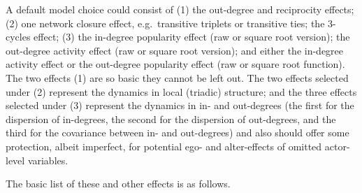 \documentclass[a4paper,fleqn,11pt]{article}
\newcommand{\+}{\, + \,}
\begin{document}
A default model choice could consist of (1) the out-degree and reciprocity
effects; (2) one network closure effect,
e.g.\ transitive triplets or transitive ties; the 3-cycles effect;
(3) the in-degree popularity effect (raw or square root version);
the out-degree activity effect (raw or square root version);
and either the in-degree activity effect or the out-degree popularity effect
(raw or square root function).
The two effects (1) are so basic they cannot be left out.
The two effects selected under (2) represent the dynamics in local (triadic) structure;
and the three effects selected under (3) represent the dynamics
in in- and out-degrees (the first for the dispersion of in-degrees,
the second for the dispersion of out-degrees, and the third for the
covariance between in- and out-degrees) and also should offer
some protection, albeit imperfect, for potential ego- and alter-effects
of omitted actor-level variables.

The basic list of these and other effects is as follows.
\end{document}
